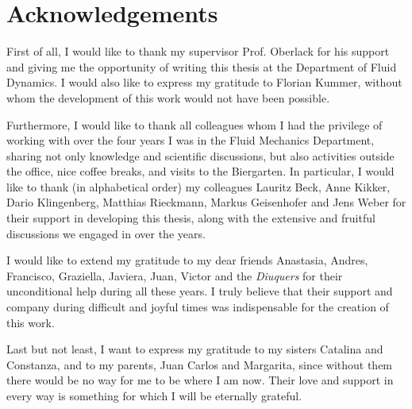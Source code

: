 \chapter*{Acknowledgements}
First of all, I would like to thank my supervisor Prof. Oberlack for his support and giving me the opportunity of writing this thesis at the Department of Fluid Dynamics. I would also like to express my gratitude to Florian Kummer, without whom the development of this work would not have been possible. 

Furthermore, I would like to thank all colleagues whom I had the privilege of working with over the four years I was in the Fluid Mechanics Department, sharing not only knowledge and scientific discussions, but also activities outside the office, nice coffee breaks, and visits to the Biergarten. In particular, I would like to thank (in alphabetical order) my colleagues Lauritz Beck, Anne Kikker, Dario Klingenberg, Matthias Rieckmann, Markus Geisenhofer and Jens Weber for their support in developing this thesis, along with the extensive and fruitful discussions we engaged in over the years.

I would like to extend my gratitude to my dear friends Anastasia, Andres, Francisco, Graziella, Javiera, Juan, Victor and the \textit{Diuquers} for their unconditional help during all these years. I truly believe that their support and company during difficult and joyful times was indispensable for the creation of this work. 

Last but not least, I want to express my gratitude to my sisters Catalina and Constanza, and to my parents, Juan Carlos and Margarita, since without them there would be no way for me to be where I am now. Their love and support in every way is something for which I will be eternally grateful.